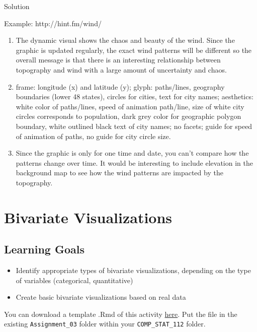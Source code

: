 \documentclass[
  letterpaper,
  DIV=11,
  numbers=noendperiod]{scrreprt}
\providecommand{\tightlist}{%
  \setlength{\itemsep}{0pt}\setlength{\parskip}{0pt}}\usepackage{longtable,booktabs,array}
\begin{document}
Solution

Example: http://hint.fm/wind/

\begin{enumerate}
\def\labelenumi{\alph{enumi}.}
\item
  The dynamic visual shows the chaos and beauty of the wind. Since the
  graphic is updated regularly, the exact wind patterns will be
  different so the overall message is that there is an interesting
  relationship between topography and wind with a large amount of
  uncertainty and chaos.
\item
  frame: longitude (x) and latitude (y); glyph: paths/lines, geography
  boundaries (lower 48 states), circles for cities, text for city names;
  aesthetics: white color of paths/lines, speed of animation path/line,
  size of white city circles corresponds to population, dark grey color
  for geographic polygon boundary, white outlined black text of city
  names; no facets; guide for speed of animation of paths, no guide for
  city circle size.
\item
  Since the graphic is only for one time and date, you can't compare how
  the patterns change over time. It would be interesting to include
  elevation in the background map to see how the wind patterns are
  impacted by the topography.
\end{enumerate}

\chapter{Bivariate Visualizations}\label{bivariate-visualizations}

\section*{Learning Goals}\label{learning-goals-3}


\begin{itemize}
\tightlist
\item
  Identify appropriate types of bivariate visualizations, depending on
  the type of variables (categorical, quantitative)
\item
  Create basic bivariate visualizations based on real data
\end{itemize}

You can download a template .Rmd of this activity
\href{template_rmd/04-Bivariate_Viz_Assign.Rmd}{here}. Put the file in
the existing \texttt{Assignment\_03} folder within your
\texttt{COMP\_STAT\_112} folder.
\end{document}
